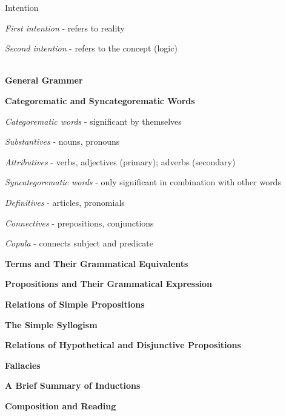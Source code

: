 \documentclass{report}
\begin{document}
\begin{outline}
\begin{outline}
\begin{outline}
\begin{outline}
      \end{outline}
      \item Intention
      \begin{outline}
        \item \textit{First intention} - refers to reality
        \item \textit{Second intention} - refers to the concept (logic)\\ \\
      \end{outline}
    \end{outline}
  \end{outline}
  \item {\bf General Grammer}
  \begin{outline}
    \item{\bf Categorematic and Syncategorematic Words}
    \begin{outline}
      \item \textit{Categorematic words} - significant by themselves
      \begin{outline}
        \item \textit{Substantives} - nouns, pronouns
        \item \textit{Attributives} - verbs, adjectives (primary); adverbs (secondary)
      \end{outline}
      \item \textit{Syncategorematic words} - only significant in combination with other words
      \begin{outline}
        \item \textit{Definitives} - articles, pronomials
        \item \textit{Connectives} - prepositions, conjunctions
        \item \textit{Copula} - connects subject and predicate
      \end{outline}
    \end{outline}
  \end{outline}
  \item {\bf Terms and Their Grammatical Equivalents}
  \item {\bf Propositions and Their Grammatical Expression}
  \item {\bf Relations of Simple Propositions}
  \item {\bf The Simple Syllogism}
  \item {\bf Relations of Hypothetical and Disjunctive Propositions}
  \item {\bf Fallacies}
  \item {\bf A Brief Summary of Inductions}
  \item {\bf Composition and Reading}
\end{outline}
\end{document}
